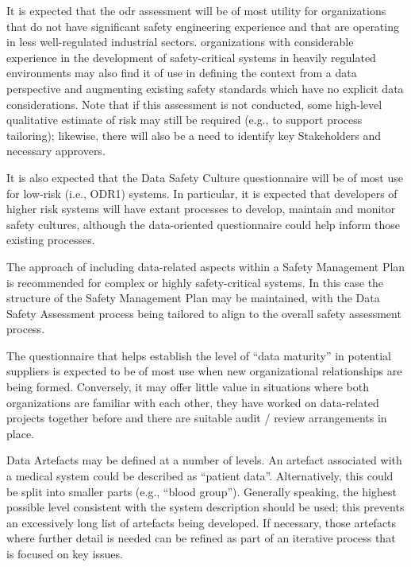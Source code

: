 It is expected that the \gls{odr} assessment will be of most utility for organizations that do not have significant safety engineering experience and that are operating in less well-regulated industrial sectors.
organizations with considerable experience in the development of safety-critical systems in heavily regulated environments
may also find it of use in defining the context from a data perspective and augmenting existing safety standards which have no explicit data considerations.
Note that if this assessment is not conducted, some high-level qualitative estimate of risk may still be required (e.g., to support process tailoring); likewise, there will also be a need to identify key Stakeholders and necessary approvers.

It is also expected that the Data Safety Culture questionnaire will be of most use for low-risk (i.e., ODR1) systems. In particular, it is expected that developers of higher risk systems will have extant processes to develop, maintain and monitor safety cultures,
although the data-oriented questionnaire could help inform those existing processes.

The approach of including data-related aspects within a Safety Management Plan is recommended for complex or highly safety-critical systems. In this case the structure of the Safety Management Plan may be maintained, with the Data Safety Assessment process being tailored to align to the overall safety assessment process.

The questionnaire that helps establish the level of ``data maturity'' in potential suppliers is expected to be of most use when new organizational relationships are being formed. Conversely, it may offer little value in situations where both organizations are familiar with each other, they have worked on data-related projects together before and there are suitable audit / review arrangements in place.

Data Artefacts may be defined at a number of levels. An artefact associated with a medical system could be described as ``patient data''. Alternatively, this could be split into smaller parts (e.g., ``blood group''). Generally speaking, the highest possible level consistent with the system description should be used; this prevents an excessively long list of artefacts being developed. If necessary, those artefacts where further detail is needed can be refined as part of an iterative process that is focused on key issues.

